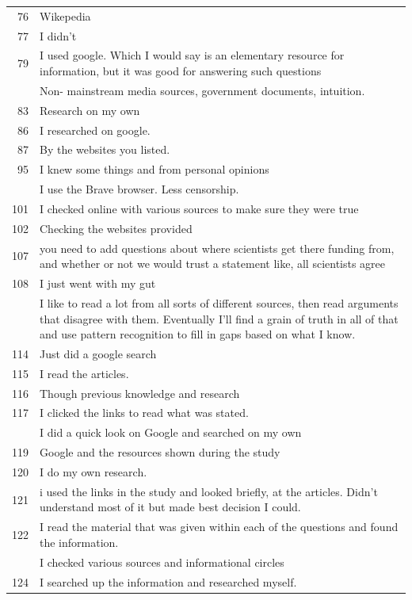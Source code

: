 \documentclass[
  doc,floatsintext]{apa6}
\begin{document}
\begin{longtable}[t]{>{}r>{\raggedright\arraybackslash}p{30em}}
76 & Wikepedia\\
77 & I didn't\\
79 & I used google. Which I would say is an elementary resource for information, but it was good for answering such questions\\
\addlinespace
82 & Non- mainstream media sources, government documents, intuition.\\
83 & Research on my own\\
86 & I researched on google.\\
87 & By the websites you listed.\\
95 & I knew some things and from personal opinions\\
\addlinespace
98 & I use the Brave browser. Less censorship.\\
101 & I checked online with various sources to make sure they were true\\
102 & Checking the websites provided\\
107 & you need to add questions about where scientists get there funding from, and whether or not we would trust a statement like, all scientists agree\\
108 & I just went with my gut\\
\addlinespace
111 & I like to read a lot from all sorts of different sources, then read arguments that disagree with them. Eventually I'll find a grain of truth in all of that and use pattern recognition to fill in gaps based on what I know.\\
114 & Just did a google search\\
115 & I read the articles.\\
116 & Though previous knowledge and research\\
117 & I clicked the links to read what was stated.\\
\addlinespace
118 & I did a quick look on Google and searched on my own\\
119 & Google and the resources shown during the study\\
120 & I do my own research.\\
121 & i used the links in the study and looked briefly, at the articles.  Didn't understand most of it but made best decision I could.\\
122 & I read the material that was given within each of the questions and found the information.\\
\addlinespace
123 & I checked various sources and informational circles\\
124 & I searched up the information and researched myself.\\

\end{longtable}
\end{document}
